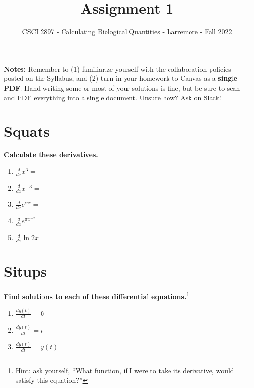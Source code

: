 \documentclass[11pt,onecolumn,superscriptaddress,notitlepage]{article}
\date{}
\newcommand{\dx}[0]{\displaystyle\frac{d}{dx}}
\begin{document}
\author{CSCI 2897 - Calculating Biological Quantities - Larremore - Fall 2022}
\title{Assignment 1}
\maketitle

{\bf Notes:} Remember to (1) familiarize yourself with the collaboration policies posted on the Syllabus, and (2) turn in your homework to Canvas as a {\bf single PDF}. Hand-writing some or most of your solutions is fine, but be sure to scan and PDF everything into a single document. Unsure how? Ask on Slack! 

\section*{Squats}

{\bf Calculate these derivatives.}

\begin{enumerate}
	\item $\dx x^3 = $
	\item $\dx x^{-3} = $
	\item $\dx e^{\alpha x} = $
	\item $\dx e^{\pi x^{-2}} = $
	\item $\dx \ln{2x} = $
\end{enumerate}

\section*{Situps}

{\bf Find solutions to each of these differential equations.}\footnote{Hint: ask yourself, ``What function, if I were to take its derivative, would satisfy this equation?''}

\begin{enumerate}[resume]
	\item $\displaystyle\frac{dy(t)}{dt} = 0$
	\item $\displaystyle\frac{dy(t)}{dt} = t$
	\item $\displaystyle\frac{dy(t)}{dt} = y(t)$
\end{enumerate}

\clearpage
\end{document}
